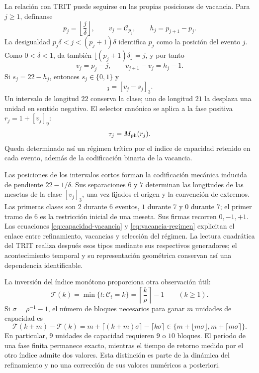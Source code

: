 La relación con TRIT puede seguirse en las propias posiciones de vacancia.
Para \(j\geq1\), defínanse
\[
 p_j=\left\lfloor\frac j\delta\right\rfloor,\qquad
 v_j=\mathcal C_{p_j},\qquad h_j=p_{j+1}-p_j.
\]
La desigualdad \(p_j\delta<j<(p_j+1)\delta\) identifica \(p_j\)
como la posición del evento \(j\). Como \(0<\delta<1\), da también
\(\lfloor(p_j+1)\delta\rfloor=j\), y por tanto
\[
 v_j=p_j-j,\qquad
 v_{j+1}-v_j=h_j-1.
\]
Si \(s_j=22-h_j\), entonces \(s_j\in\{0,1\}\) y
\begin{equation}
 [v_{j+1}]_3=[v_j-s_j]_3.
 \label{eq:vacancia-regimen}
\end{equation}
Un intervalo de longitud \(22\) conserva la clase; uno de longitud
\(21\) la desplaza una unidad en sentido negativo. El selector canónico
se aplica a la fase positiva \(r_j=1+[v_j]_9\):
\[
 \tau_j=M_{\rm ph}(r_j).
\]
Queda determinado así un régimen trítico por el índice de capacidad
retenido en cada evento, además de la codificación binaria de la vacancia.

Las posiciones de los intervalos cortos forman la codificación mecánica
inducida de pendiente \(22-1/\delta\). Sus separaciones \(6\) y \(7\)
determinan las longitudes de las mesetas de la clase \([v_j]_3\), una
vez fijados el origen y la convención de extremos. Las primeras clases
son \(2\) durante \(6\) eventos, \(1\) durante \(7\) y \(0\) durante
\(7\); el primer tramo de \(6\) es la restricción inicial de una meseta.
Sus firmas recorren \(0,-1,+1\). Las ecuaciones
\eqref{eq:capacidad-vacancia} y \eqref{eq:vacancia-regimen} explicitan el
enlace entre refinamiento, vacancias y selección del régimen. La lectura
cuadrática del TRIT realiza después esos tipos mediante sus respectivos
generadores; el acontecimiento temporal y su representación geométrica
conservan así una dependencia identificable.

La inversión del índice monótono proporciona otra observación útil:
\[
 \mathcal T(k)=\min\{t:\mathcal C_t=k\}
   =\left\lceil\frac k\rho\right\rceil-1\qquad(k\geq1).
\]
Si \(\sigma=\rho^{-1}-1\), el número de bloques necesarios para ganar
\(m\) unidades de capacidad es
\[
 \mathcal T(k+m)-\mathcal T(k)
 =m+\lceil(k+m)\sigma\rceil-\lceil k\sigma\rceil
 \in\{m+\lfloor m\sigma\rfloor,m+\lceil m\sigma\rceil\}.
\]
En particular, \(9\) unidades de capacidad requieren \(9\) o \(10\)
bloques. El período de una fase finita permanece exacto, mientras el
tiempo de retorno medido por el otro índice admite dos valores. Esta
distinción es parte de la dinámica del refinamiento y no una corrección
de sus valores numéricos a posteriori.


